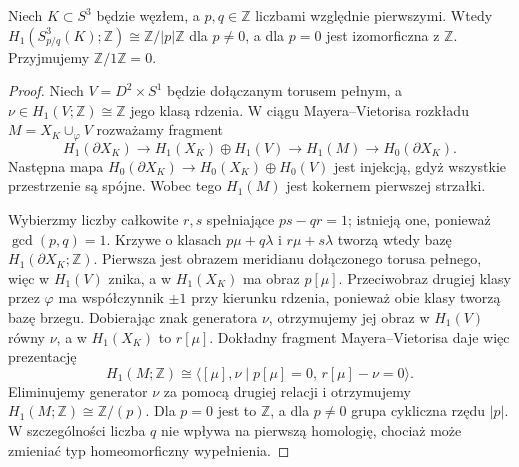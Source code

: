 \begin{twierdzenie}
\label{thm:kt-dehn-h1}
Niech $K\subset S^3$ będzie węzłem, a $p,q\in\mathbb Z$
liczbami względnie pierwszymi. Wtedy
$H_1(S^3_{p/q}(K);\mathbb Z)\cong\mathbb Z/|p|\mathbb Z$
dla $p\ne0$, a dla $p=0$ jest izomorficzna z $\mathbb Z$.
Przyjmujemy $\mathbb Z/1\mathbb Z=0$.
\end{twierdzenie}

\begin{proof}
Niech $V=D^2\times S^1$ będzie dołączanym torusem pełnym,
a $\nu\in H_1(V;\mathbb Z)\cong\mathbb Z$ jego klasą rdzenia.
W ciągu Mayera--Vietorisa rozkładu
$M=X_K\cup_\varphi V$ rozważamy fragment
\[
H_1(\partial X_K)\longrightarrow H_1(X_K)\oplus H_1(V)
\longrightarrow H_1(M)\longrightarrow
H_0(\partial X_K).
\]
Następna mapa $H_0(\partial X_K)\to
H_0(X_K)\oplus H_0(V)$ jest injekcją,
gdyż wszystkie przestrzenie są spójne. Wobec tego $H_1(M)$
jest kokernem pierwszej strzałki.

Wybierzmy liczby całkowite $r,s$ spełniające
$ps-qr=1$; istnieją one, ponieważ $\gcd(p,q)=1$.
Krzywe o klasach $p\mu+q\lambda$ i
$r\mu+s\lambda$ tworzą wtedy bazę
$H_1(\partial X_K;\mathbb Z)$.
Pierwsza jest obrazem meridianu dołączonego
torusa pełnego, więc w $H_1(V)$ znika,
a w $H_1(X_K)$ ma obraz $p[\mu]$.
Przeciwobraz drugiej klasy przez $\varphi$ ma
współczynnik $\pm1$ przy kierunku rdzenia, ponieważ
obie klasy tworzą bazę brzegu. Dobierając znak
generatora $\nu$, otrzymujemy jej obraz w $H_1(V)$
równy $\nu$,
a w $H_1(X_K)$ to $r[\mu]$.
Dokładny fragment Mayera--Vietorisa daje więc
prezentację
\[
H_1(M;\mathbb Z)\cong
\langle[\mu],\nu\mid p[\mu]=0,\,
r[\mu]-\nu=0\rangle.
\]
Eliminujemy generator $\nu$ za pomocą
drugiej relacji i otrzymujemy
$H_1(M;\mathbb Z)\cong\mathbb Z/(p)$.
Dla $p=0$ jest to $\mathbb Z$,
a dla $p\ne0$ grupa cykliczna rzędu $|p|$.
W szczególności liczba $q$ nie wpływa na
pierwszą homologię, chociaż może zmieniać
typ homeomorficzny wypełnienia.
\end{proof}

